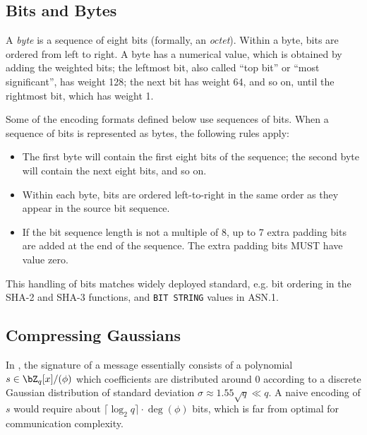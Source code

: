 \subsection{Bits and Bytes}

A \emph{byte} is a sequence of eight bits (formally, an \emph{octet}).
Within a byte, bits are ordered from left to right. A byte has a
numerical value, which is obtained by adding the weighted bits; the
leftmost bit, also called ``top bit'' or ``most significant'', has
weight 128; the next bit has weight 64, and so on, until the rightmost
bit, which has weight 1.

Some of the encoding formats defined below use sequences of bits. When
a sequence of bits is represented as bytes, the following rules apply:
\begin{itemize}
\item The first byte will contain the first eight bits of the sequence;
the second byte will contain the next eight bits, and so on.
\item Within each byte, bits are ordered left-to-right in the same order
as they appear in the source bit sequence.
\item If the bit sequence length is not a multiple of 8, up to 7 extra
padding bits are added at the end of the sequence. The extra padding bits
MUST have value zero.
\end{itemize}

This handling of bits matches widely deployed standard, e.g. bit
ordering in the SHA-2 and SHA-3 functions, and \texttt{BIT STRING}
values in ASN.1.

\subsection{Compressing Gaussians} \label{sec:spec:encode:compress}


In \falcon, the signature of a message essentially consists of a polynomial $s \in \bZ_q[x]/(\phi)$ which coefficients are distributed around $0$ according to a discrete Gaussian distribution of standard deviation $\sigma \approx 1.55 \sqrt{q} \ll q$. A naive encoding of $s$ would require about $\lceil \log_2 q\rceil \cdot \deg(\phi)$ bits, which is far from optimal for communication complexity.

